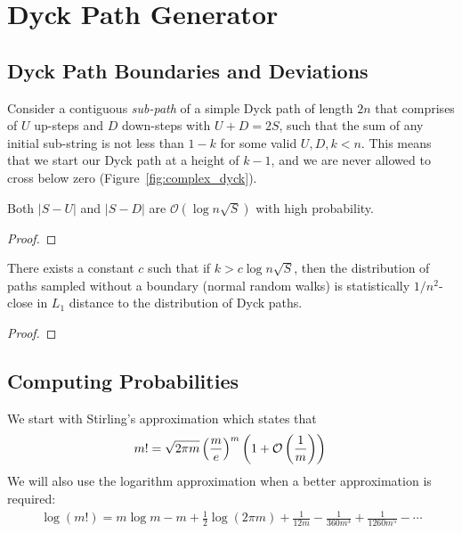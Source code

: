 \section{Dyck Path Generator}%
\label{sec:dyck_appendix}

\subsection{Dyck Path Boundaries and Deviations}%
\label{sub:dyck_path_boundaries_and_deviations}
Consider a contiguous \emph{sub-path} of a simple Dyck path of length $2n$ that comprises of $U$ up-steps and $D$ down-steps
with $U + D = 2S$, such that the sum of any initial sub-string is not less than $1-k$ for some valid $U, D, k < n$.
This means that we start our Dyck path at a height of $k-1$,
and we are never allowed to cross below zero (Figure~\ref{fig:complex_dyck}).

\begin{lemma}
\label{lem:}
Both $|S-U|$ and $|S-D|$ are $\mathcal O(\log n\sqrt S)$ with high probability.
\end{lemma}
\begin{proof}

\end{proof}
\begin{lemma}
\label{lem:}
There exists a constant $c$ such that if $k > c\log n\sqrt S$, then the distribution of paths sampled without a boundary
(normal random walks) is statistically $1/n^2$-close in $L_1$ distance to the distribution of Dyck paths.
\end{lemma}
\begin{proof}

\end{proof}


\subsection{Computing Probabilities}%
\label{sub:computing_probabilities}
We start with Stirling's approximation which states that
\[
m! = \sqrt{2\pi m}\left( \frac me\right)^m\left( 1 + \mathcal O\left( \frac 1m\right)\right)\\
\]
We will also use the logarithm approximation when a better approximation is required:
\begin{align}
    \label{eq:log_factorial_approximation}
\log (m!) = m\log m -m + \frac 12 \log(2\pi m) + \frac{1}{12m} - \frac{1}{360m^3} + \frac{1}{1260m^5} - \cdots
\end{align}

